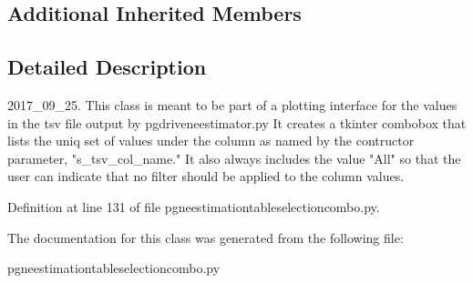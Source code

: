 \subsection*{Additional Inherited Members}


\subsection{Detailed Description}
\begin{DoxyVerb}2017_09_25.  This class is meant to be part of a plotting
interface for the values in the tsv file output by 
pgdriveneestimator.py  It creates a tkinter combobox
that lists the uniq set of values under the column as
named by the contructor parameter, "s_tsv_col_name." It
also always includes the value "All" so that the user can
indicate that no filter should be applied to the column values.
\end{DoxyVerb}
 

Definition at line 131 of file pgneestimationtableselectioncombo.\+py.



The documentation for this class was generated from the following file\+:\begin{DoxyCompactItemize}
\item 
pgneestimationtableselectioncombo.\+py\end{DoxyCompactItemize}
